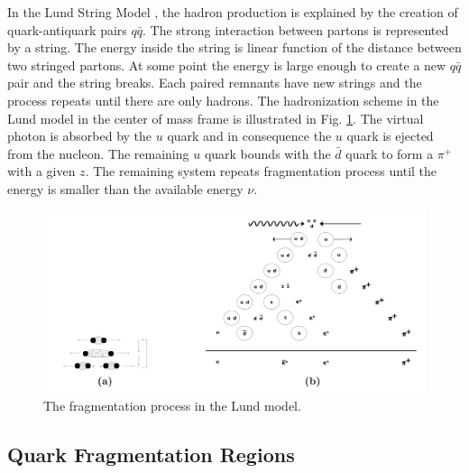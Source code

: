 In the Lund String Model \cite{LUND}, the hadron production is explained by the creation of quark-antiquark pairs $q\bar{q}$. The strong interaction between partons is represented by a string. The energy inside the string is linear function of the distance between two stringed partons. At some point the energy is large enough to create a new $q\bar{q}$ pair and the string breaks. Each paired remnants have new strings and the process repeats until there are only hadrons. The hadronization scheme in the Lund model in the center of mass frame is illustrated in Fig. \ref{pic:Lund}. The virtual photon is absorbed by the $u$ quark and in consequence the $u$ quark is ejected from the nucleon. The remaining $u$ quark bounds with the $\bar{d}$ quark to form a $\pi^+$ with a given $z$. The remaining system repeats fragmentation process until the energy is smaller than the available energy $\nu$.

\begin{figure}[!h]
  \centering
	\includegraphics[scale=0.45]{./gfx/Lund.png}
	\caption{The fragmentation process in the Lund model.}
	\label{pic:Lund}
\end{figure}

\subsection{Quark Fragmentation Regions}

